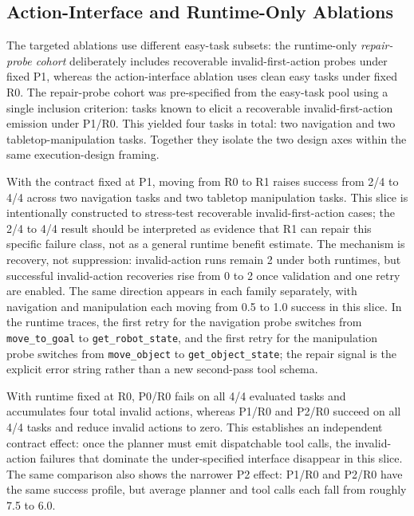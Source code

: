 



\subsection{Action-Interface and Runtime-Only Ablations}

The targeted ablations use different easy-task subsets: the runtime-only
\emph{repair-probe cohort} deliberately includes recoverable
invalid-first-action probes under fixed P1, whereas the action-interface
ablation uses clean easy tasks under fixed R0. The repair-probe cohort was pre-specified from the easy-task pool
using a single inclusion criterion: tasks known to elicit a recoverable
invalid-first-action emission under P1/R0. This yielded four tasks in
total: two navigation and two tabletop-manipulation tasks. Together they isolate the two
design axes within the same execution-design framing.

With the contract fixed at P1, moving from R0 to R1 raises success from
2/4 to 4/4 across two navigation tasks and two tabletop manipulation tasks.
This slice is intentionally constructed to stress-test recoverable
invalid-first-action cases; the 2/4 to 4/4 result should be interpreted as
evidence that R1 can repair this specific failure class, not as a general
runtime benefit estimate.
The mechanism is recovery, not suppression: invalid-action runs remain 2
under both runtimes, but successful invalid-action recoveries rise from 0 to
2 once validation and one retry are enabled. The same direction appears in
each family separately, with navigation and manipulation each moving from
0.5 to 1.0 success in this slice. In the runtime traces, the first retry for
the navigation probe switches from \texttt{move\_to\_goal} to
\texttt{get\_robot\_state}, and the first retry for the manipulation probe
switches from \texttt{move\_object} to \texttt{get\_object\_state}; the repair
signal is the explicit error string rather than a new second-pass tool schema.

With runtime fixed at R0, P0/R0 fails on all 4/4 evaluated tasks and
accumulates four total invalid actions, whereas P1/R0 and P2/R0 succeed on
all 4/4 tasks and reduce invalid actions to zero. This establishes an
independent contract effect: once the planner must emit dispatchable tool
calls, the invalid-action failures that dominate the under-specified interface
disappear in this slice. The same comparison also shows the narrower P2
effect: P1/R0 and P2/R0 have the same success profile, but average planner
and tool calls each fall from roughly 7.5 to 6.0.

